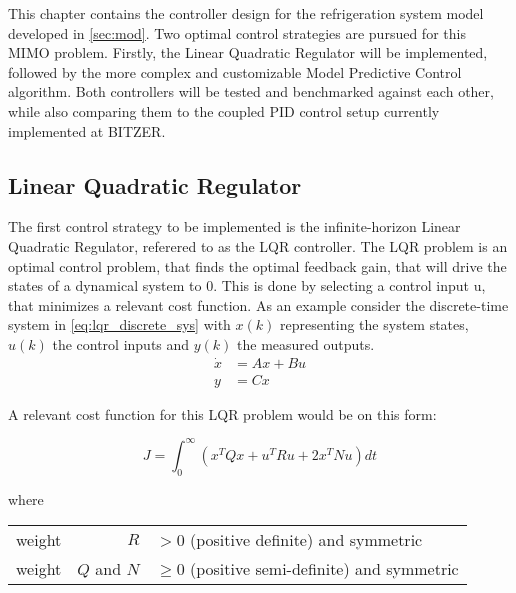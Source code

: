 This chapter contains the controller design for the refrigeration system model developed in \cref{sec:mod}. Two optimal control strategies are pursued for this MIMO problem. Firstly, the Linear Quadratic Regulator will be implemented, followed by the more complex and customizable Model Predictive Control algorithm. Both controllers will be tested and benchmarked against each other, while also comparing them to the coupled PID control setup currently implemented at BITZER.






\subsection{Linear Quadratic Regulator}
The first control strategy to be implemented is the infinite-horizon Linear Quadratic Regulator, referered to as the LQR controller. The LQR problem is an optimal control problem, that finds the optimal feedback gain, that will drive the states of a dynamical system to 0. This is done by selecting a control input u, that minimizes a relevant cost function. As an example consider the discrete-time system in \cref{eq:lqr_discrete_sys} with $x(k)$ representing the system states, $u(k)$ the control inputs and $y(k)$ the measured outputs.\\

\begin{equation} \label{eq:lqr_discrete_sys}
	\begin{split}
		\dot{x} 	& = Ax + Bu \\
		y 	& = Cx
	\end{split}
\end{equation}

A relevant cost function for this LQR problem would be on this form:

\begin{equation} \label{eq:lqr_cost_fcn}
	J = \int_0^{\infty} \left(x^TQx + u^TRu + 2x^TNu\right)dt
\end{equation}

where

\begin{center}
	\begin{tabular}{l r l }
		weight & $R$         & $ > 0$ (positive definite) and symmetric       \\
		weight & $Q$ and $N$ & $\ge 0$ (positive semi-definite) and symmetric
	\end{tabular}
\end{center}

